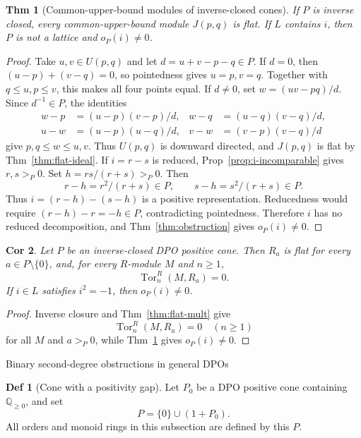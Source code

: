 \documentclass[10pt,letterpaper]{amsart}
\makeatletter
\numberwithin{equation}{section}
\newtheorem{thm}{Thm}[section]
\newtheorem{cor}[thm]{Cor}
\theoremstyle{definition}
\newtheorem{defn}{Def}[section]
\newcommand{\Q}{\mathbb Q}
\newcommand{\Tor}{\operatorname{Tor}}
\def\subsection{\@startsection{subsection}{2}
  \z@{.9\linespacing\@plus.3\linespacing}{.4\linespacing}
  {\normalfont\fontsize{11.5}{14}\selectfont\bfseries\boldmath\raggedright}}
\makeatother
\begin{document}
\begin{thm}[Common-upper-bound modules of inverse-closed cones]\label{thm:inverse-interpolation}
If $P$ is inverse closed, every common-upper-bound module $J(p,q)$ is flat. If $L$ contains $i$, then $P$ is not a lattice and $o_P(i)\ne0$.
\end{thm}
\begin{proof}
Take $u,v\in U(p,q)$ and let $d=u+v-p-q\in P$. If $d=0$, then $(u-p)+(v-q)=0$, so pointedness gives $u=p,v=q$. Together with $q\le u,p\le v$, this makes all four points equal.
If $d\ne0$, set $w=(uv-pq)/d$. Since $d^{-1}\in P$, the identities
\[
\begin{aligned}
w-p&=(u-p)(v-p)/d,&w-q&=(u-q)(v-q)/d,\\
u-w&=(u-p)(u-q)/d,&v-w&=(v-p)(v-q)/d
\end{aligned}
\]
give $p,q\le w\le u,v$. Thus $U(p,q)$ is downward directed, and $J(p,q)$ is flat by Thm~\ref{thm:flat-ideal}.
If $i=r-s$ is reduced, Prop~\ref{prop:i-incomparable} gives $r,s>_P0$. Set $h=rs/(r+s)>_P0$. Then
\[
r-h=r^2/(r+s)\in P,\qquad s-h=s^2/(r+s)\in P.
\]
Thus $i=(r-h)-(s-h)$ is a positive representation. Reducedness would require $(r-h)-r=-h\in P$, contradicting pointedness. Therefore $i$ has no reduced decomposition, and Thm~\ref{thm:obstruction} gives $o_P(i)\ne0$.
\end{proof}

\begin{cor}\label{cor:tor-not-lattice}
Let $P$ be an inverse-closed DPO positive cone. Then $R_a$ is flat for every $a\in P\setminus\{0\}$, and, for every $R$-module $M$ and $n\ge1$,
\[
\Tor_n^R(M,R_a)=0.
\]
If $i\in L$ satisfies $i^2=-1$, then $o_P(i)\ne0$.
\end{cor}
\begin{proof}
Inverse closure and Thm~\ref{thm:flat-mult} give
\[
\Tor_n^R(M,R_a)=0\quad(n\ge1)
\]
for all $M$ and $a>_P0$, while Thm~\ref{thm:inverse-interpolation} gives $o_P(i)\ne0$.
\end{proof}

\subsection{Binary second-degree obstructions in general DPOs}
\begin{defn}[Cone with a positivity gap]\label{def:gap-cone}
Let $P_0$ be a DPO positive cone containing $\Q_{\ge0}$, and set
\[
P=\{0\}\cup(1+P_0).
\]
All orders and monoid rings in this subsection are defined by this $P$.
\end{defn}
\end{document}
